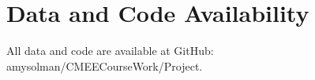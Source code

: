 \chapter{Data and Code Availability}

All data and code are available at GitHub: amysolman/CMEECourseWork/Project.